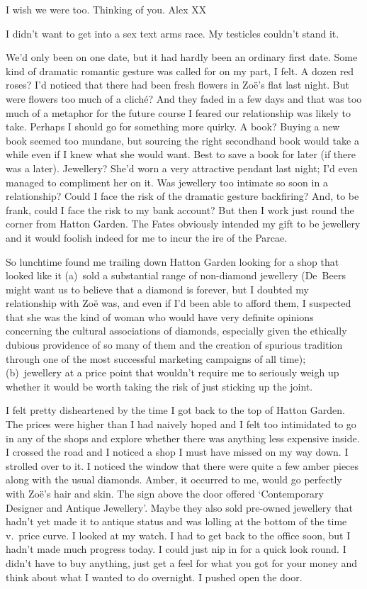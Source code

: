 \vskip 12pt
{\twelvett I wish we were too. Thinking of you. Alex XX}
\vskip 12pt

I didn't want to get into a sex text arms race. My testicles
couldn't stand it.

We'd only been on one date, but it had hardly been an ordinary first
date. Some kind of dramatic romantic gesture was called for on my
part, I felt. A dozen red roses? I'd noticed that there had been
fresh flowers in Zoë's flat last night. But were flowers too
much of a cliché? And they faded in a few days and that was too
much of a metaphor for the future course I feared our relationship
was likely to take. Perhaps I should go for something more quirky. A
book? Buying a new book seemed too mundane, but sourcing the right
secondhand book would take a while even if I knew what she would
want. Best to save a book for later (if there was a later).
Jewellery? She'd worn a very attractive pendant last night; I'd even
managed to compliment her on it. Was jewellery too intimate so soon
in a relationship? Could I face the risk of the dramatic gesture
backfiring? And, to be frank, could I face the risk to my bank
account? But then I work just round the corner from Hatton Garden.
The Fates obviously intended my gift to be jewellery and it would
foolish indeed for me to incur the ire of the Parcae.

So lunchtime found me trailing down Hatton Garden looking for a shop
that looked like it (a)~sold a substantial range of non-diamond
jewellery (De~Beers might want us to believe that a diamond is
forever, but I doubted my relationship with Zoë was, and even if
I'd been able to afford them, I suspected that she was the kind of
woman who would have very definite opinions concerning the cultural
associations of diamonds, especially given the ethically dubious
providence of so many of them and the creation of spurious tradition
through one of the most successful marketing campaigns of all time);
(b)~jewellery at a price point that wouldn't require me to seriously
weigh up whether it would be worth taking the risk of just sticking
up the joint.

I felt pretty disheartened by the time I got back to the top of
Hatton Garden. The prices were higher than I had naively hoped and I
felt too intimidated to go in any of the shops and explore whether
there was anything less expensive inside. I crossed the road and I
noticed a shop I must have missed on my way down. I strolled over to
it. I noticed the window that there were quite a few amber pieces
along with the usual diamonds. Amber, it occurred to me, would go
perfectly with Zoë's hair and skin. The sign above the door
offered `Contemporary Designer and Antique Jewellery'. Maybe they
also sold pre-owned jewellery that hadn't yet made it to antique
status and was lolling at the bottom of the time v.~price curve. I
looked at my watch. I had to get back to the office soon, but I
hadn't made much progress today. I could just nip in for a quick
look round. I didn't have to buy anything, just get a feel for what
you got for your money and think about what I wanted to do
overnight. I pushed open the door.

